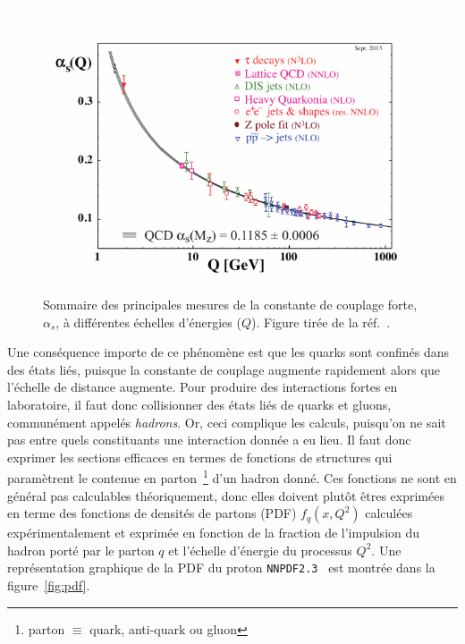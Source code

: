 \begin{figure}
  \centering
  \includegraphics{alpha_s.pdf}
  \caption{Sommaire des principales mesures de la constante de couplage forte, $\alpha_s$, à différentes échelles d'énergies ($Q$). Figure tirée de la réf.~\cite{olive_qcd_2014}.}
\label{fig:alpha_s}
\end{figure}

Une conséquence importe de ce phénomène est que les quarks sont
confinés dans des états liés, puisque la constante de couplage
augmente rapidement alors que l'échelle de distance augmente. Pour
produire des interactions fortes en laboratoire, il faut donc
collisionner des états liés de quarks et gluons, communément appelés
\emph{hadrons}. Or, ceci complique les calculs, puisqu'on ne sait pas
entre quels constituants une interaction donnée a eu lieu. Il faut
donc exprimer les sections efficaces en termes de fonctions de
structures qui paramètrent le contenue en parton~\footnote{parton
  $\equiv$ quark, anti-quark ou gluon} d'un hadron donné. Ces
fonctions ne sont en général pas calculables théoriquement, donc elles
doivent plutôt êtres exprimées en terme des fonctions de densités de
partons (PDF) $f_q(x,Q^2)$ calculées expérimentalement et exprimée en
fonction de la fraction de l'impulsion du hadron porté par le parton
$q$ et l'échelle d'énergie du processus $Q^2$. Une représentation
graphique de la PDF du proton
\texttt{NNPDF2.3}~\cite{ball_parton_2013} est montrée dans la
figure~\ref{fig:pdf}.

